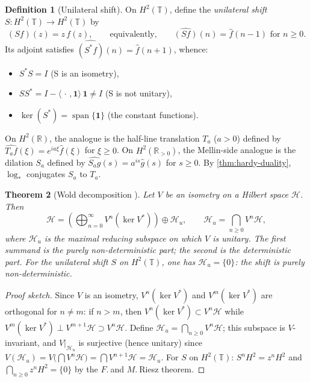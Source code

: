 \documentclass[12pt]{amsart}
\newtheorem{theorem}{Theorem}[section]
\theoremstyle{definition}
\newtheorem{definition}[theorem]{Definition}
\theoremstyle{remark}
\newcommand{\R}{\mathbb{R}}
\newcommand{\Rpos}{\mathbb{R}_{>0}}
\newcommand{\bT}{\mathbb{T}}
\newcommand{\Htwo}{H^2}
\begin{document}
\begin{definition}[Unilateral shift]\label{def:shift}
On $\Htwo(\bT)$, define the \emph{unilateral shift} $S : \Htwo(\bT) \to \Htwo(\bT)$ by
\begin{equation}\label{eq:shift}
(Sf)(z) = z\, f(z), \qquad \text{equivalently,} \qquad \widehat{(Sf)}(n) = \widehat{f}(n-1) \text{ for } n \geq 0.
\end{equation}
Its adjoint satisfies $\widehat{(S^*f)}(n) = \widehat{f}(n+1)$, whence:
\begin{itemize}
\item $S^*S = I$ \quad (S is an isometry),
\item $SS^* = I - \langle \,\cdot\,, \mathbf{1}\rangle\, \mathbf{1} \neq I$ \quad (S is not unitary),
\item $\ker(S^*) = \operatorname{span}\{\mathbf{1}\}$ \quad (the constant functions).
\end{itemize}
On $\Htwo(\R)$, the analogue is the half-line translation $T_a$ ($a > 0$) defined by $\widehat{T_a f}(\xi) = e^{ia\xi}\widehat{f}(\xi)$ for $\xi \geq 0$. On $\Htwo(\Rpos)$, the Mellin-side analogue is the dilation $S_a$ defined by $\widehat{S_a g}(s) = a^{is}\widehat{g}(s)$ for $s \geq 0$. By \cref{thm:hardy-duality}, $\log_*$ conjugates $S_a$ to $T_a$.
\end{definition}

\begin{theorem}[Wold decomposition {\cite[Chapter~I]{SzNF}}]\label{thm:wold}
Let $V$ be an isometry on a Hilbert space $\mathcal{H}$. Then
\begin{equation}\label{eq:wold}
\mathcal{H} = \left(\bigoplus_{n=0}^{\infty} V^n(\ker V^*)\right) \oplus \mathcal{H}_u, \qquad \mathcal{H}_u = \bigcap_{n \geq 0} V^n \mathcal{H},
\end{equation}
where $\mathcal{H}_u$ is the maximal reducing subspace on which $V$ is unitary. The first summand is the \emph{purely non-deterministic} part; the second is the \emph{deterministic} part. For the unilateral shift $S$ on $\Htwo(\bT)$, one has $\mathcal{H}_u = \{0\}$: the shift is purely non-deterministic.
\end{theorem}

\begin{proof}[Proof sketch]
Since $V$ is an isometry, $V^n(\ker V^*)$ and $V^m(\ker V^*)$ are orthogonal for $n \neq m$: if $n > m$, then $V^n(\ker V^*) \subset V^{n}\mathcal{H}$ while $V^m(\ker V^*) \perp V^{m+1}\mathcal{H} \supset V^n\mathcal{H}$. Define $\mathcal{H}_u = \bigcap_{n \geq 0} V^n\mathcal{H}$; this subspace is $V$-invariant, and $V|_{\mathcal{H}_u}$ is surjective (hence unitary) since $V(\mathcal{H}_u) = V\bigl(\bigcap V^n\mathcal{H}\bigr) = \bigcap V^{n+1}\mathcal{H} = \mathcal{H}_u$. For $S$ on $\Htwo(\bT)$: $S^n\Htwo = z^n\Htwo$ and $\bigcap_{n \geq 0} z^n\Htwo = \{0\}$ by the $F.\ $and $M.\ $Riesz theorem.
\end{proof}
\end{document}
